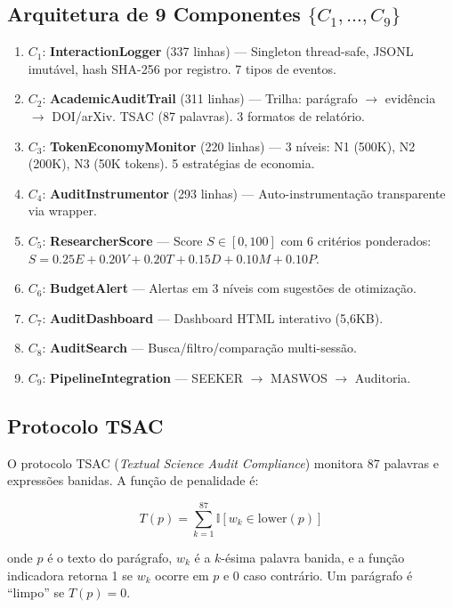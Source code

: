 \documentclass[12pt,a4paper]{article}
\begin{document}
\subsection{Arquitetura de 9 Componentes $\{C_1, \ldots, C_9\}$}

\begin{enumerate}[itemsep=1pt]
  \item $C_1$: \textbf{InteractionLogger} (337 linhas) --- Singleton thread-safe, JSONL imutável, hash SHA-256 por registro. 7 tipos de eventos.
  \item $C_2$: \textbf{AcademicAuditTrail} (311 linhas) --- Trilha: parágrafo $\rightarrow$ evidência $\rightarrow$ DOI/arXiv. TSAC (87 palavras). 3 formatos de relatório.
  \item $C_3$: \textbf{TokenEconomyMonitor} (220 linhas) --- 3 níveis: N1 (500K), N2 (200K), N3 (50K tokens). 5 estratégias de economia.
  \item $C_4$: \textbf{AuditInstrumentor} (293 linhas) --- Auto-instrumentação transparente via wrapper.
  \item $C_5$: \textbf{ResearcherScore} --- Score $S \in [0,100]$ com 6 critérios ponderados: $S = 0.25E + 0.20V + 0.20T + 0.15D + 0.10M + 0.10P$.
  \item $C_6$: \textbf{BudgetAlert} --- Alertas em 3 níveis com sugestões de otimização.
  \item $C_7$: \textbf{AuditDashboard} --- Dashboard HTML interativo (5,6KB).
  \item $C_8$: \textbf{AuditSearch} --- Busca/filtro/comparação multi-sessão.
  \item $C_9$: \textbf{PipelineIntegration} --- SEEKER $\rightarrow$ MASWOS $\rightarrow$ Auditoria.
\end{enumerate}

\subsection{Protocolo TSAC}

O protocolo TSAC (\textit{Textual Science Audit Compliance}) monitora 87 palavras e expressões banidas. A função de penalidade é:

\begin{equation}
  T(p) = \sum_{k=1}^{87} \mathbb{I}[w_k \in \text{lower}(p)]
\end{equation}

onde $p$ é o texto do parágrafo, $w_k$ é a $k$-ésima palavra banida, e a função indicadora retorna 1 se $w_k$ ocorre em $p$ e 0 caso contrário. Um parágrafo é ``limpo'' se $T(p) = 0$.
\end{document}

